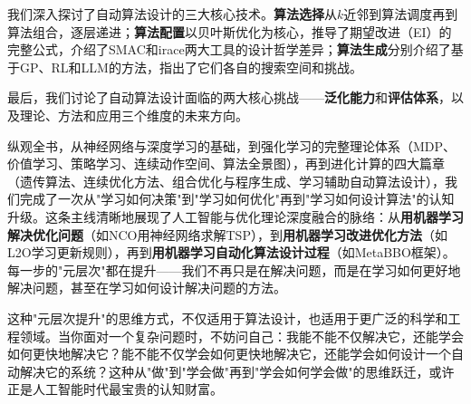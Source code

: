 \documentclass[lang=cn,zihao=-4,a4paper,fontset=windows]{beautybook}
\begin{document}
我们深入探讨了自动算法设计的三大核心技术。\textbf{算法选择}从$k$近邻到算法调度再到算法组合，逐层递进；\textbf{算法配置}以贝叶斯优化为核心，推导了期望改进（EI）的完整公式，介绍了SMAC和irace两大工具的设计哲学差异；\textbf{算法生成}分别介绍了基于GP、RL和LLM的方法，指出了它们各自的搜索空间和挑战。

最后，我们讨论了自动算法设计面临的两大核心挑战——\textbf{泛化能力}和\textbf{评估体系}，以及理论、方法和应用三个维度的未来方向。

纵观全书，从神经网络与深度学习的基础，到强化学习的完整理论体系（MDP、价值学习、策略学习、连续动作空间、算法全景图），再到进化计算的四大篇章（遗传算法、连续优化方法、组合优化与程序生成、学习辅助自动算法设计），我们完成了一次从"学习如何决策"到"学习如何优化"再到"学习如何设计算法"的认知升级。这条主线清晰地展现了人工智能与优化理论深度融合的脉络：从\textbf{用机器学习解决优化问题}（如NCO用神经网络求解TSP），到\textbf{用机器学习改进优化方法}（如L2O学习更新规则），再到\textbf{用机器学习自动化算法设计过程}（如MetaBBO框架）。每一步的"元层次"都在提升——我们不再只是在解决问题，而是在学习如何更好地解决问题，甚至在学习如何设计解决问题的方法。

这种"元层次提升"的思维方式，不仅适用于算法设计，也适用于更广泛的科学和工程领域。当你面对一个复杂问题时，不妨问自己：我能不能不仅解决它，还能学会如何更快地解决它？能不能不仅学会如何更快地解决它，还能学会如何设计一个自动解决它的系统？这种从"做"到"学会做"再到"学会如何学会做"的思维跃迁，或许正是人工智能时代最宝贵的认知财富。



\end{document}
